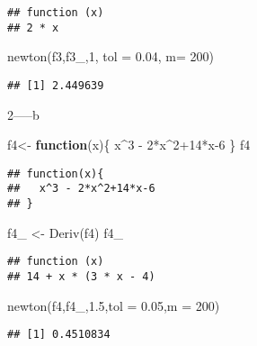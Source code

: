 \documentclass[
]{article}
\newenvironment{Shaded}{\begin{snugshade}}{\end{snugshade}}
\newcommand{\AttributeTok}[1]{\textcolor[rgb]{0.77,0.63,0.00}{#1}}
\newcommand{\ControlFlowTok}[1]{\textcolor[rgb]{0.13,0.29,0.53}{\textbf{#1}}}
\newcommand{\DecValTok}[1]{\textcolor[rgb]{0.00,0.00,0.81}{#1}}
\newcommand{\FloatTok}[1]{\textcolor[rgb]{0.00,0.00,0.81}{#1}}
\newcommand{\FunctionTok}[1]{\textcolor[rgb]{0.00,0.00,0.00}{#1}}
\newcommand{\NormalTok}[1]{#1}
\newcommand{\OtherTok}[1]{\textcolor[rgb]{0.56,0.35,0.01}{#1}}
\newcommand{\SpecialCharTok}[1]{\textcolor[rgb]{0.00,0.00,0.00}{#1}}
\begin{document}
\begin{verbatim}
## function (x) 
## 2 * x
\end{verbatim}

\begin{Shaded}
\begin{Highlighting}[]
\FunctionTok{newton}\NormalTok{(f3,f3\_,}\DecValTok{1}\NormalTok{, }\AttributeTok{tol =} \FloatTok{0.04}\NormalTok{, }\AttributeTok{m=} \DecValTok{200}\NormalTok{)}
\end{Highlighting}
\end{Shaded}

\begin{verbatim}
## [1] 2.449639
\end{verbatim}

2-----b

\begin{Shaded}
\begin{Highlighting}[]
\NormalTok{f4}\OtherTok{\textless{}{-}} \ControlFlowTok{function}\NormalTok{(x)\{}
\NormalTok{  x}\SpecialCharTok{\^{}}\DecValTok{3} \SpecialCharTok{{-}} \DecValTok{2}\SpecialCharTok{*}\NormalTok{x}\SpecialCharTok{\^{}}\DecValTok{2}\SpecialCharTok{+}\DecValTok{14}\SpecialCharTok{*}\NormalTok{x}\DecValTok{{-}6}
\NormalTok{\}}
\NormalTok{f4}
\end{Highlighting}
\end{Shaded}

\begin{verbatim}
## function(x){
##   x^3 - 2*x^2+14*x-6
## }
\end{verbatim}

\begin{Shaded}
\begin{Highlighting}[]
\NormalTok{f4\_ }\OtherTok{\textless{}{-}} \FunctionTok{Deriv}\NormalTok{(f4)}
\NormalTok{f4\_}
\end{Highlighting}
\end{Shaded}

\begin{verbatim}
## function (x) 
## 14 + x * (3 * x - 4)
\end{verbatim}

\begin{Shaded}
\begin{Highlighting}[]
\FunctionTok{newton}\NormalTok{(f4,f4\_,}\FloatTok{1.5}\NormalTok{,}\AttributeTok{tol =} \FloatTok{0.05}\NormalTok{,}\AttributeTok{m =} \DecValTok{200}\NormalTok{)}
\end{Highlighting}
\end{Shaded}

\begin{verbatim}
## [1] 0.4510834
\end{verbatim}
\end{document}
